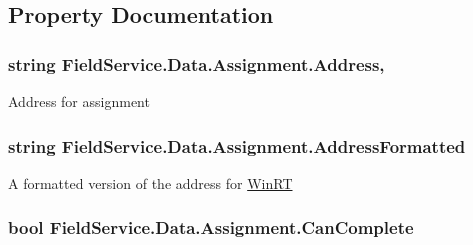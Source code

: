 \subsection{Property Documentation}
\hypertarget{class_field_service_1_1_data_1_1_assignment_a886d3c71c11ae05b2dca152f02d3070e}{
\subsubsection[{Address}]{\setlength{\rightskip}{0pt plus 5cm}string Field\+Service.\+Data.\+Assignment.\+Address\hspace{0.3cm}{\ttfamily [get]}, {\ttfamily [set]}}}\label{class_field_service_1_1_data_1_1_assignment_a886d3c71c11ae05b2dca152f02d3070e}


Address for assignment 

\hypertarget{class_field_service_1_1_data_1_1_assignment_a2ec62817dbecfc9307d655c6f3dd016c}{
\subsubsection[{Address\+Formatted}]{\setlength{\rightskip}{0pt plus 5cm}string Field\+Service.\+Data.\+Assignment.\+Address\+Formatted\hspace{0.3cm}{\ttfamily [get]}}}\label{class_field_service_1_1_data_1_1_assignment_a2ec62817dbecfc9307d655c6f3dd016c}


A formatted version of the address for \hyperlink{namespace_field_service_1_1_win_r_t}{Win\+R\+T} 

\hypertarget{class_field_service_1_1_data_1_1_assignment_a4b8c35afb1178923213bed8490e25ec5}{
\subsubsection[{Can\+Complete}]{\setlength{\rightskip}{0pt plus 5cm}bool Field\+Service.\+Data.\+Assignment.\+Can\+Complete\hspace{0.3cm}{\ttfamily [get]}}}\label{class_field_service_1_1_data_1_1_assignment_a4b8c35afb1178923213bed8490e25ec5}


